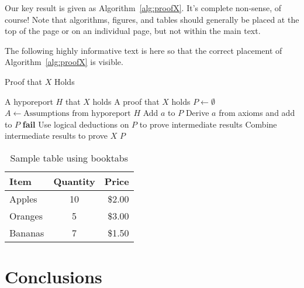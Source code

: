 \documentclass[a4paper,oneside,bibliography=totoc]{scrartcl}
\begin{document}
Our key result is given as Algorithm~\ref{alg:proofX}. It's complete non-sense,
of course! Note that algorithms, figures, and tables should generally be placed
at the top of the page or on an individual page, but not within the main text.

The following highly informative text is here so that the correct placement of
Algorithm~\ref{alg:proofX} is visible. \lipsum[1-3]

\begin{algorithm}[t]
  \caption{Proof that $X$ Holds}
  \label{alg:proofX}
  \begin{algorithmic}[1]
    \REQUIRE A hyporeport $H$ that $X$ holds \ENSURE A proof that $X$ holds
    \STATE $P \leftarrow \emptyset$  \STATE $A \leftarrow \text{Assumptions from hyporeport } H$
       \STATE Add $a$ to $P$ 
    \STATE Derive $a$ from axioms and add to $P$ \ELSE \STATE \textbf{fail}
     \ENDIF \ENDFOR
    \STATE Use logical deductions on $P$ to prove intermediate results \STATE
    Combine intermediate results to prove $X$ \RETURN $P$ 
  \end{algorithmic}
\end{algorithm}

\lipsum[4-10]

\begin{table}[tb]
  \centering
  \begin{tabular}{lcr}
    \toprule
    \textbf{Item} & \textbf{Quantity} & \textbf{Price} \\
    \midrule
    Apples  & 10 & \$2.00 \\
    Oranges & 5  & \$3.00 \\
    Bananas & 7  & \$1.50 \\
    \bottomrule
  \end{tabular}
  \caption{Sample table using booktabs}
  \label{tab:sample}
\end{table}

\section{Conclusions}
\end{document}
